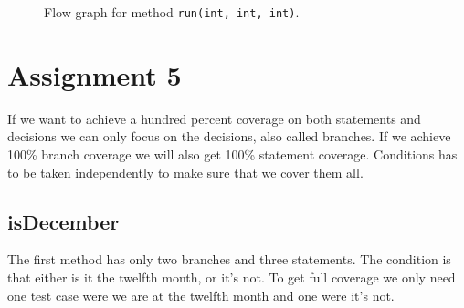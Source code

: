 \documentclass[a4paper]{article}
\begin{document}
\begin{figure}[h!]
    \begin{center}
        \caption{Flow graph for method \texttt{run(int, int, int)}.}
        \label{figure:run}
    \end{center}
\end{figure}

\section*{Assignment 5}

If we want to achieve a hundred percent coverage on both statements and decisions we can only focus on the decisions, also called branches. If we achieve 100\% branch coverage we will also get 100\% statement coverage. Conditions has to be taken independently to make sure that we cover them all.

\subsection*{isDecember}

The first method has only two branches and three statements. The condition is that either is it the twelfth month, or it's not. To get full coverage we only need one test case were we are at the twelfth month and one were it's not.
\end{document}
